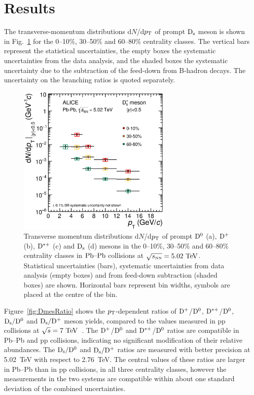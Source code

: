 \section{Results}
\label{sec:PbPbResults}
The transverse-momentum distributions d$N$/d$p_{\rm T}$ of prompt ${\rm D_s}$ meson 
is shown in Fig.~\ref{fig:DmesCorrYields010}
for the 0--10\%, 30--50\% and 60--80\% centrality classes. 
The vertical bars represent the statistical uncertainties, the empty boxes
the systematic uncertainties from the data analysis, and the shaded boxes
the systematic uncertainty due to the subtraction of the feed-down from 
B-hadron decays. The uncertainty on the branching ratios is quoted separately.

\begin{figure}[!t]
 \begin{center}
\includegraphics[angle=0, width=7.5cm]{FigCap5/Ds_dNdpt_010_3050_6080.eps}
 \end{center}
 \caption{Transverse momentum distributions d$N$/d$p_{\rm T}$ of 
prompt ${\rm D^0}$ (a), ${\rm D^+}$ (b), ${\rm D^{*+}}$ (c) and ${\rm D_s}$ (d)  mesons in the 0--10\%, 30--50\% and 60--80\% 
centrality classes in $\mbox{Pb--Pb}$ collisions 
at $\sqrt{s_{\rm \scriptscriptstyle NN}}=5.02~\mathrm{TeV}$. 
Statistical uncertainties (bars), systematic uncertainties from data 
analysis (empty boxes) and from feed-down subtraction 
(shaded boxes) are shown. 
Horizontal bars represent bin widths, symbols are placed at the centre of 
the bin. }
 \label{fig:DmesCorrYields010} 
\end{figure} 



Figure~\ref{fig:DmesRatio} shows the $p_{\rm T}$-dependent ratios of
${\rm D^+}$/${\rm D^0}$, ${\rm D^{*+}}$/${\rm D^0}$, ${\rm D_s}/{\rm D^0}$ and ${\rm D_s}/{\rm D^+}$ meson yields, 
compared to the values measured in pp collisions at $\sqrt s=7~\mathrm{TeV}$~\cite{Acharya:2017jgo}. 
The ${\rm D^+}$/${\rm D^0}$ and ${\rm D^{*+}}$/${\rm D^0}$ ratios are compatible in Pb--Pb and pp collisions, 
indicating no significant modification of their relative abundances. 
The ${\rm D_s}/{\rm D^0}$ and ${\rm D_s}/{\rm D^+}$ ratios are measured with better precision at 5.02~TeV with respect to 2.76~TeV.
The central values of these ratios are larger in Pb--Pb than in pp collisions, in all three centrality classes, however
the measurements in the two systems are compatible within about one standard deviation of the combined uncertainties.
\iffalse

